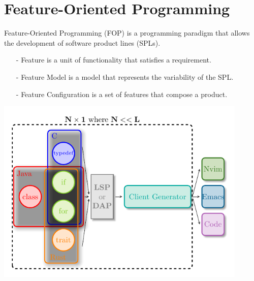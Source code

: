 \documentclass[9pt,xcolor=table,svgnames]{beamer}
\begin{document}

\section[FOP]{Feature-Oriented Programming}

\begin{frame}{\secname}

    \alert{Feature-Oriented Programming} (FOP) is a programming paradigm that allows the development of \alert{software product lines} (SPLs).

    \pause

    \bigskip
    \begin{itemize}
        \item[\alert{-}] \alert{Feature} is a unit of functionality that satisfies a requirement.
        \item[\alert{-}] \alert{Feature Model} is a model that represents the variability of the SPL.
        \item[\alert{-}] \alert{Feature Configuration} is a set of features that compose a product.
    \end{itemize}

    \bigskip

    \noindent{}%

\end{frame}


\begin{frame}{\secname}
    \begin{center}
        \includegraphics[width=0.9\textwidth]{figs/lsp-combination-nx1.pdf}
    \end{center}
\end{frame}
\end{document}

